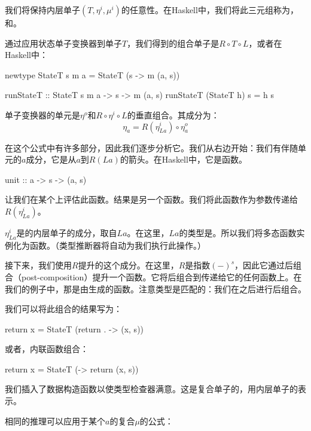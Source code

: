\documentclass[DaoFP]{subfiles}
\begin{document}
    我们将保持内层单子$(T, \eta^i, \mu^i)$的任意性。在Haskell中，我们将此三元组称为，和。

    通过应用状态单子变换器到单子$T$，我们得到的组合单子是$R \circ T \circ L$，或者在Haskell中：
    \begin{haskell}
        newtype StateT s m a = StateT (s -> m (a, s))
    \end{haskell}

    \begin{haskell}
        runStateT :: StateT s m a -> s -> m (a, s)
        runStateT (StateT h) s = h s
    \end{haskell}

    单子变换器的单元是$\eta^o$和$R \circ \eta^i \circ L$的垂直组合。其成分为：
    \[ \eta_a = R(\eta^i_{L a}) \circ \eta^o_a \]

    在这个公式中有许多部分，因此我们逐步分析它。我们从右边开始：我们有伴随单元的$a$成分，它是从$a$到$R (L a)$的箭头。在Haskell中，它是函数。
    \begin{haskell}
        unit :: a -> s -> (a, s)
    \end{haskell}
    让我们在某个上评估此函数。结果是另一个函数。我们将此函数作为参数传递给$R(\eta^i_{L a})$。

    $\eta^i_{L a}$是的内层单子的成分，取自$L a$。在这里，$L a$的类型是。所以我们将多态函数实例化为函数。（类型推断器将自动为我们执行此操作。）

    接下来，我们使用$R$提升的这个成分。在这里，$R$是指数$(-)^s$，因此它通过后组合（post-composition）提升一个函数。它将后组合到传递给它的任何函数上。在我们的例子中，那是由生成的函数。注意类型是匹配的：我们在之后进行后组合。

    我们可以将此组合的结果写为：
    \begin{haskell}
        return x = StateT (return . \s -> (x, s))
    \end{haskell}
    或者，内联函数组合：
    \begin{haskell}
        return x = StateT (\s -> return (x, s))
    \end{haskell}
    我们插入了数据构造函数以使类型检查器满意。这是复合单子的，用内层单子的表示。

    相同的推理可以应用于某个$a$的复合$\mu$的公式：
\end{document}
